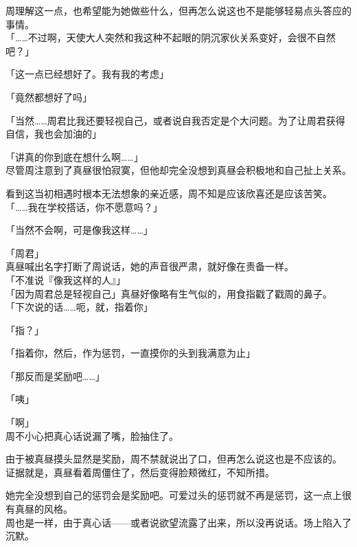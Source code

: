 周理解这一点，也希望能为她做些什么，但再怎么说这也不是能够轻易点头答应的事情。\\

「……不过啊，天使大人突然和我这种不起眼的阴沉家伙关系变好，会很不自然吧？」

「这一点已经想好了。我有我的考虑」

「竟然都想好了吗」

「当然……周君比我还要轻视自己，或者说自我否定是个大问题。为了让周君获得自信，我也会加油的」

「讲真的你到底在想什么啊……」\\

尽管周注意到了真昼很怕寂寞，但他却完全没想到真昼会积极地和自己扯上关系。

看到这当初相遇时根本无法想象的亲近感，周不知是应该欣喜还是应该苦笑。\\

「……我在学校搭话，你不愿意吗？」

「当然不会啊，可是像我这样……」

「周君」\\

真昼喊出名字打断了周说话，她的声音很严肃，就好像在责备一样。\\

「不准说『像我这样的人』」\\

「因为周君总是轻视自己」真昼好像略有生气似的，用食指戳了戳周的鼻子。\\

「下次说的话……呃，就，指着你」

「指？」

「指着你，然后，作为惩罚，一直摸你的头到我满意为止」

「那反而是奖励吧……」

「咦」

「啊」\\

周不小心把真心话说漏了嘴，脸抽住了。

由于被真昼摸头显然是奖励，周不禁就说出了口，但再怎么说这也是不应该的。\\

证据就是，真昼看着周僵住了，然后变得脸颊微红，不知所措。

她完全没想到自己的惩罚会是奖励吧。可爱过头的惩罚就不再是惩罚，这一点上很有真昼的风格。\\

周也是一样，由于真心话——或者说欲望流露了出来，所以没再说话。场上陷入了沉默。\\

